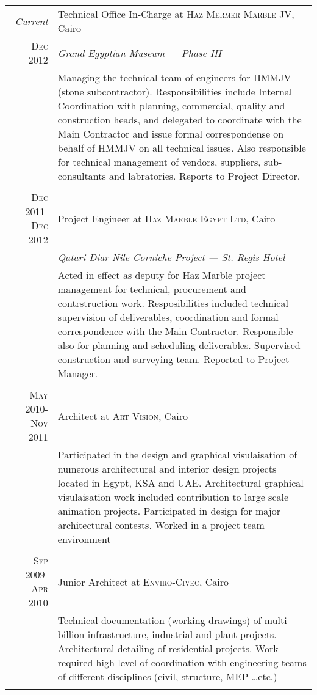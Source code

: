 \documentclass[a4paper,10pt]{article} %
\begin{document}
\begin{tabular}{r|p{11cm}}
\emph{Current} & Technical Office In-Charge at \textsc{Haz Mermer Marble JV}, Cairo\\
\textsc{Dec 2012} & \emph{Grand Egyptian Museum --- Phase III}\\ 
& \footnotesize{Managing the technical team of engineers for HMMJV (stone subcontractor). Responsibilities include Internal Coordination with planning, commercial, quality and construction heads, and delegated to coordinate with the Main Contractor and issue formal correspondense on behalf of HMMJV on all technical issues. Also responsible for technical management of vendors, suppliers, sub-consultants and labratories. Reports to Project Director.}\\
\multicolumn{2}{c}{} \\


\textsc{Dec 2011-Dec 2012} & Project Engineer at \textsc{Haz Marble Egypt Ltd}, Cairo \\
& \emph{Qatari Diar Nile Corniche Project --- St. Regis Hotel} \\
& \footnotesize{Acted in effect as deputy for Haz Marble project management for technical, procurement and contrstruction work. Resposibilities included technical supervision of deliverables, coordination and formal correspondence with the Main Contractor. Responsible also for planning and scheduling deliverables. Supervised construction and surveying team. Reported to Project Manager.}\\
\multicolumn{2}{c}{} \\


\textsc{May 2010-Nov 2011} & Architect at \textsc{Art Vision}, Cairo \emph{}\\
& \footnotesize{Participated in the design and graphical visulaisation of numerous architectural and interior design projects located in Egypt, KSA and UAE. Architectural graphical visulaisation work included contribution to large scale animation projects. Participated in design for major architectural contests. Worked in a project team environment}\\
\multicolumn{2}{c}{} \\



\textsc{Sep 2009-Apr 2010} & Junior Architect at \textsc{Enviro-Civec}, Cairo \emph{}\\
& \footnotesize{Technical documentation (working drawings) of multi-billion infrastructure, industrial and plant projects. Architectural detailing of residential projects. Work required high level of coordination with engineering teams of different disciplines (civil, structure, MEP \ldots{}etc.)}\\
\multicolumn{2}{c}{} \\



\end{tabular}
\end{document}
